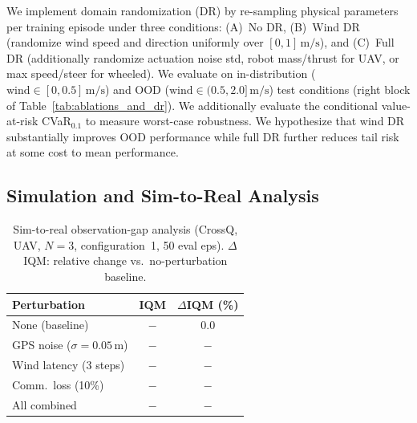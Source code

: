 \documentclass{article}
\begin{document}
We implement domain randomization (DR) \citep{tobin2017domain, peng2018sim2real} by re-sampling physical parameters per training episode under three conditions: (A)~No DR, (B)~Wind DR (randomize wind speed and direction uniformly over $[0, 1]\,\text{m/s}$), and (C)~Full DR (additionally randomize actuation noise std, robot mass/thrust for UAV, or max speed/steer for wheeled). We evaluate on in-distribution ($\text{wind} \in [0, 0.5]\,\text{m/s}$) and OOD ($\text{wind} \in (0.5, 2.0]\,\text{m/s}$) test conditions (right block of Table~\ref{tab:ablations_and_dr}). We additionally evaluate the conditional value-at-risk CVaR$_{0.1}$ \citep{tamar2015cvar} to measure worst-case robustness. We hypothesize that wind DR substantially improves OOD performance while full DR further reduces tail risk at some cost to mean performance.
\vspace{-4pt}

\subsection{Simulation and Sim-to-Real Analysis}
\label{sec:exp:s2r}

\begin{table}
\vspace{-1.8em}
\centering
\caption{\small Sim-to-real observation-gap analysis (CrossQ, UAV, $N\!=\!3$, configuration~1, 50 eval eps). $\Delta$IQM: relative change vs.\ no-perturbation baseline.}
\label{tab:obs_gap}
\setlength{\tabcolsep}{4pt}
\small
\begin{tabular}{lcc}
    \toprule
    \textbf{Perturbation} & \textbf{IQM} & $\Delta$\textbf{IQM (\%)} \\
    \midrule
    None (baseline)                      & $-$ & $0.0$   \\
    GPS noise ($\sigma\!=\!0.05$\,m)     & $-$ & $-$     \\
    Wind latency (3 steps)               & $-$ & $-$     \\
    Comm.\ loss (10\%)                   & $-$ & $-$     \\
    All combined                         & $-$ & $-$     \\
    \bottomrule
\end{tabular}
\vspace{-0.8em}
\end{table}
\end{document}
